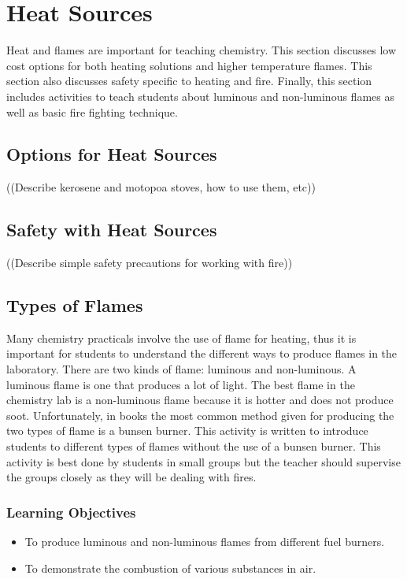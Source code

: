 \section{Heat Sources}

Heat and flames are important for teaching chemistry. This section discusses low cost options for both heating solutions and higher temperature flames. This section also discusses safety specific to heating and fire. Finally, this section includes activities to teach students about luminous and non-luminous flames as well as basic fire fighting technique.

\subsection{Options for Heat Sources}

((Describe kerosene and motopoa stoves, how to use them, etc))


\subsection{Safety with Heat Sources}

((Describe simple safety precautions for working with fire))

\subsection{Types of Flames}
Many chemistry practicals involve the use of flame for heating, thus it is important for students to understand the different ways to produce flames in the laboratory. There are two kinds of flame: luminous and non-luminous. A luminous flame is one that produces a lot of light. The best flame in the chemistry lab is a non-luminous flame because it is hotter and does not produce soot. Unfortunately, in books the most common method given for producing the two types of flame is a bunsen burner. This activity is written to introduce students to different types of flames without the use of a bunsen burner. This activity is best done by students in small groups but the teacher should supervise the groups closely as they will be dealing with fires.
\subsubsection*{Learning Objectives}
\begin{itemize}
\item{To produce luminous and non-luminous flames from different fuel burners.}
\item{To demonstrate the combustion of various substances in air.}
\end{itemize}

